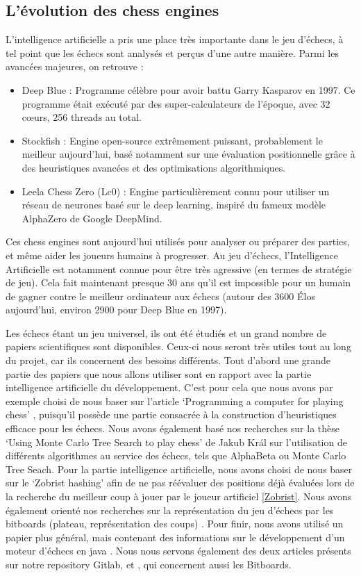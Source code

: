 \documentclass{article}
\begin{document}
\subsection{L’évolution des chess engines}
L’intelligence artificielle a pris une place très importante dans le jeu d'échecs, à tel point que les échecs
sont analysés et perçus d'une autre manière. Parmi les avancées majeures, on retrouve :
\begin{itemize}
    \item Deep Blue : Programme célèbre pour avoir battu Garry Kasparov en 1997. Ce programme était exécuté par des super-calculateurs
    de l'époque, avec 32 cœurs, 256 threads au total.
    \item Stockfish : Engine open-source extrêmement puissant, probablement le meilleur aujourd'hui, basé notamment sur une évaluation positionnelle
    grâce à des heuristiques avancées et des optimisations algorithmiques.
    \item Leela Chess Zero (Lc0) : Engine particulièrement connu pour utiliser un réseau de neurones basé sur le deep learning, inspiré du fameux
    modèle AlphaZero de Google DeepMind.
\end{itemize}
Ces chess engines sont aujourd’hui utilisés pour analyser ou préparer des parties, et même aider les
joueurs humains à progresser. Au jeu d'échecs, l'Intelligence Artificielle est notamment connue pour être très agressive
(en termes de stratégie de jeu). Cela fait maintenant presque 30 ans qu'il est impossible pour un humain de gagner contre
le meilleur ordinateur aux échecs (autour des 3600 Élos aujourd'hui, environ 2900 pour Deep Blue en 1997).

Les échecs étant un jeu universel, ils ont été étudiés et un grand nombre de papiers scientifiques
sont disponibles. Ceux-ci nous seront très utiles tout au long du projet, car ils concernent des
besoins différents. Tout d'abord une grande partie des papiers que nous allons utiliser sont en rapport
avec la partie intelligence artificielle du développement. C'est pour cela que nous avons par exemple
choisi de nous baser sur l'article `Programming a computer for playing chess' \cite{Shannon1950}, 
puisqu'il possède une partie consacrée à la construction d'heuristiques efficace pour les échecs.
Nous avons également basé nos recherches sur la thèse `Using Monte Carlo Tree Search to play chess' \cite{Kral2021}
de Jakub Král sur l'utilisation de différents algorithmes au service des échecs, tels que AlphaBeta ou
Monte Carlo Tree Seach. Pour la partie intelligence artificielle, nous avons choisi de nous baser sur le 
`Zobrist hashing' \cite{ZobristHashing} afin de ne pas réévaluer des positions déjà évaluées lors de la 
recherche du meilleur coup à jouer par le joueur artificiel \ref{Zobrist}. Nous avons également orienté
nos recherches sur la représentation du jeu d'échecs par les bitboards (plateau, représentation des coups) \cite{Bijl2021}.
Pour finir, nous avons utilisé un papier plus général, mais contenant des informations sur le développement
d'un moteur d'échecs en java \cite{PaulDailly}. Nous nous servons également des deux articles présents sur 
notre repository Gitlab, \cite{Bitboards} et \cite{GameBitboards}, qui concernent aussi les Bitboards.
\end{document}
